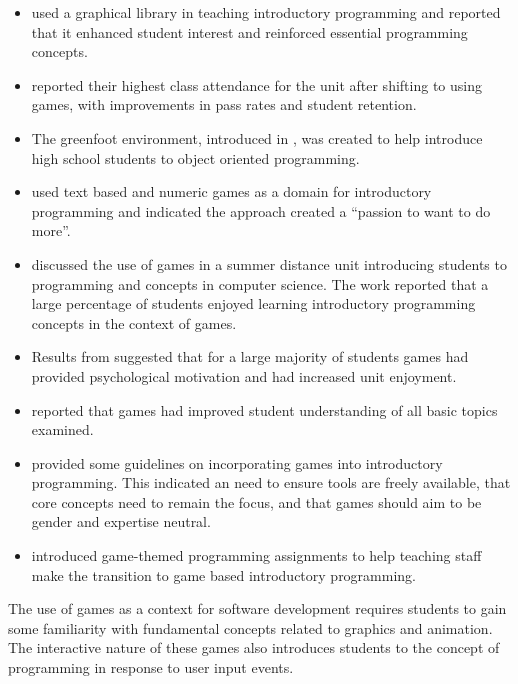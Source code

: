 \begin{itemize}[noitemsep,nolistsep]
	\item \citet{Roberts:1995} used a graphical library in teaching introductory programming and reported that it enhanced student interest and reinforced essential programming concepts.

	\item \citet{Feldgen:2004} reported their highest class attendance for the unit after shifting to using games, with improvements in pass rates and student retention.

	\item The greenfoot environment, introduced in \citet{Kulling:2005}, was created to help introduce high school students to object oriented programming.

	\item \cite{Rajaravivarma:2005} used text based and numeric games as a domain for introductory programming and indicated the approach created a ``passion to want to do more''.

	\item \citet{Bayliss:2006} discussed the use of games in a summer distance unit introducing students to programming and concepts in computer science. The work reported that a large percentage of students enjoyed learning introductory programming concepts in the context of games.

	\item Results from \citet{Cliburn:2006} suggested that for a large majority of students games had provided psychological motivation and had increased unit enjoyment.

	\item \citet{Leutenegger:2007} reported that games had improved student understanding of all basic topics examined.

	\item \citet{Sung:2009} provided some guidelines on incorporating games into introductory programming. This indicated an need to ensure tools are freely available, that core concepts need to remain the focus, and that games should aim to be gender and expertise neutral.

	\item \citet{Sung:2011} introduced game-themed programming assignments to help teaching staff make the transition to game based introductory programming.

\end{itemize}

The use of games as a context for software development requires students to gain some familiarity with fundamental concepts related to graphics and animation. The interactive nature of these games also introduces students to the concept of programming in response to user input events.

